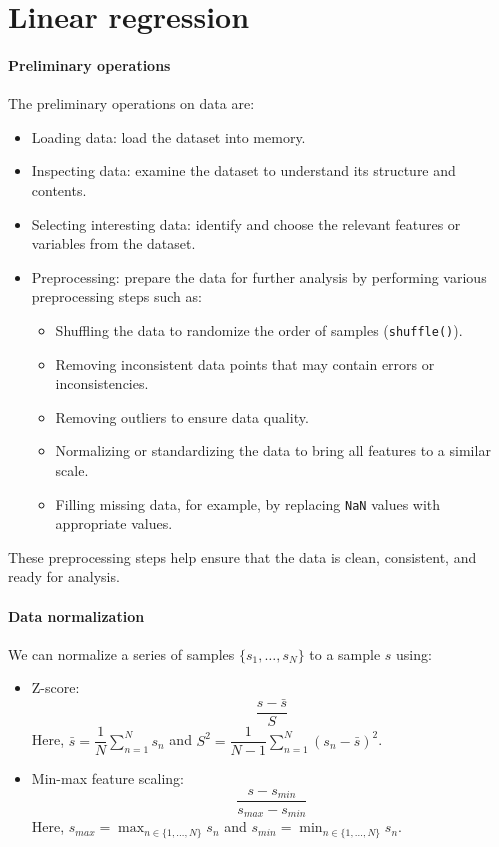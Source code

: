 \section{Linear regression}

\paragraph*{Preliminary operations}
The preliminary operations on data are: 
\begin{itemize}
    \item Loading data: load the dataset into memory.
    \item Inspecting data: examine the dataset to understand its structure and contents.
    \item Selecting interesting data: identify and choose the relevant features or variables from the dataset.
    \item Preprocessing: prepare the data for further analysis by performing various preprocessing steps such as:
        \begin{itemize}
            \item Shuffling the data to randomize the order of samples (\texttt{shuffle()}).
            \item Removing inconsistent data points that may contain errors or inconsistencies.
            \item Removing outliers to ensure data quality.
            \item Normalizing or standardizing the data to bring all features to a similar scale.
            \item Filling missing data, for example, by replacing \texttt{NaN} values with appropriate values.
        \end{itemize}
\end{itemize}
These preprocessing steps help ensure that the data is clean, consistent, and ready for analysis.

\paragraph*{Data normalization}
We can normalize a series of samples $\{ s_1,\dots,s_N \}$ to a sample $s$ using: 
\begin{itemize}
    \item Z-score: 
        \[\dfrac{s-\bar{s}}{S}\]
        Here, $\bar{s}=\dfrac{1}{N}\sum_{n=1}^Ns_n$ and $S^2=\dfrac{1}{N-1}\sum_{n=1}^N\left(s_n-\bar{s}\right)^2$. 
    \item Min-max feature scaling: 
        \[\dfrac{s-s_{min}}{s_{max}-s_{min}}\]
        Here, $s_{max}=\max_{n\in\{1,\dots,N\}}s_n$ and $s_{min}=\min_{n\in\{1,\dots,N\}}s_n$. 
\end{itemize}

